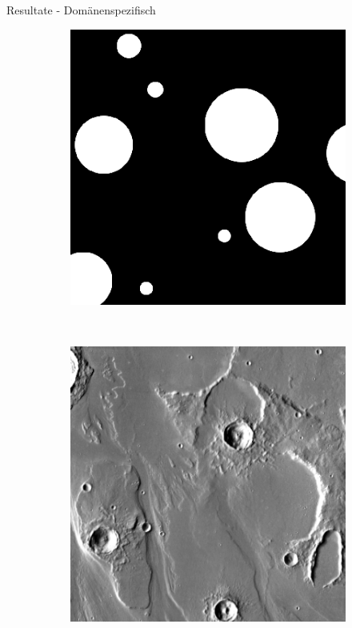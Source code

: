 \documentclass{beamer}
\begin{document}
\begin{frame}[allowframebreaks]{Resultate - Domänenspezifisch}
\begin{minipage}{0.38\textwidth}
\begin{figure}[h!]
\begin{subfigure}[t]{0.31\textwidth}
			\end{subfigure}
			\begin{subfigure}[t]{0.31\textwidth}
				\includegraphics[width=\linewidth,keepaspectratio]{gfx/rob_hum/thm_dir_N-30_210.png_tile_100.png}
			\end{subfigure}\\
			\begin{subfigure}[t]{0.31\textwidth}
				\includegraphics[width=\linewidth,keepaspectratio]{gfx/rob_in/thm_dir_N-30_210.png_sourcetile_160.png}

\end{subfigure}
\end{figure}
\end{minipage}
\end{frame}
\end{document}
